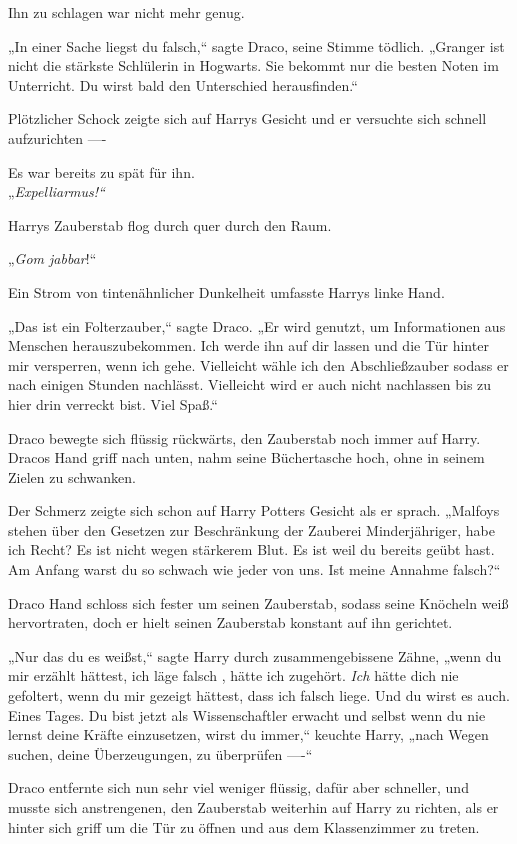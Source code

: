 {Ihn zu schlagen war nicht mehr genug.

„In einer Sache liegst du falsch,“ sagte Draco, seine Stimme tödlich. „Granger ist nicht die stärkste Schlülerin in Hogwarts. Sie bekommt nur die besten Noten im Unterricht. Du wirst bald den Unterschied herausfinden.“

Plötzlicher Schock zeigte sich auf Harrys Gesicht und er versuchte sich schnell aufzurichten ----

Es war bereits zu spät für ihn.\\ „\emph{Expelliarmus!“}

Harrys Zauberstab flog durch quer durch den Raum.

„\emph{Gom jabbar}!“

Ein Strom von tintenähnlicher Dunkelheit umfasste Harrys linke Hand.

„Das ist ein Folterzauber,“ sagte Draco. „Er wird genutzt, um Informationen aus Menschen herauszubekommen. Ich werde ihn auf dir lassen und die Tür hinter mir versperren, wenn ich gehe. Vielleicht wähle ich den Abschließzauber sodass er nach einigen Stunden nachlässt. Vielleicht wird er auch nicht nachlassen bis zu hier drin verreckt bist. Viel Spaß.“

Draco bewegte sich flüssig rückwärts, den Zauberstab noch immer auf Harry. Dracos Hand griff nach unten, nahm seine Büchertasche hoch, ohne in seinem Zielen zu schwanken.

Der Schmerz zeigte sich schon auf Harry Potters Gesicht als er sprach. „Malfoys stehen über den Gesetzen zur Beschränkung der Zauberei Minderjähriger, habe ich Recht? Es ist nicht wegen stärkerem Blut. Es ist weil du bereits geübt hast. Am Anfang warst du so schwach wie jeder von uns. Ist meine Annahme falsch?“

Draco Hand schloss sich fester um seinen Zauberstab, sodass seine Knöcheln weiß hervortraten, doch er hielt seinen Zauberstab konstant auf ihn gerichtet.

„Nur das du es weißst,“ sagte Harry durch zusammengebissene Zähne, „wenn du mir erzählt hättest, ich läge falsch , hätte ich zugehört. \emph{Ich} hätte dich nie gefoltert, wenn du mir gezeigt hättest, dass ich falsch liege. Und du wirst es auch. Eines Tages. Du bist jetzt als Wissenschaftler erwacht und selbst wenn du nie lernst deine Kräfte einzusetzen, wirst du immer,“ keuchte Harry, „nach Wegen suchen, deine Überzeugungen, zu überprüfen ----“

Draco entfernte sich nun sehr viel weniger flüssig, dafür aber schneller, und musste sich anstrengenen, den Zauberstab weiterhin auf Harry zu richten, als er hinter sich griff um die Tür zu öffnen und aus dem Klassenzimmer zu treten.

}
